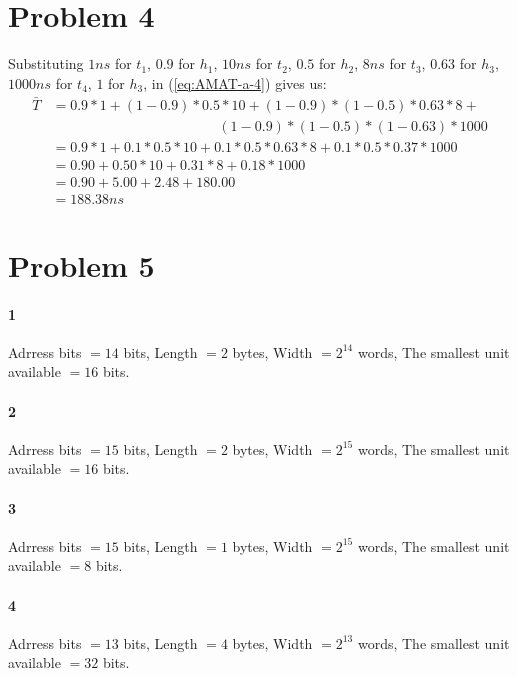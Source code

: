 \documentclass[11pt]{article}
\begin{document}
\section{Problem 4}
Substituting $1ns$ for $t_1$, $0.9$ for $h_1$, $10ns$ for $t_2$, $0.5$ for $h_2$, $8ns$ for $t_3$, $0.63$ for $h_3$,$1000ns$ for $t_4$, $1$ for $h_3$,
in (\ref{eq:AMAT-a-4}) gives us:
\begin{align*}
	\bar{T} &= 0.9 * 1 + (1 - 0.9) * 0.5 * 10 + (1 - 0.9) * (1 - 0.5) * 0.63 * 8 + \\
	&\qquad \phantom{= 0.1 * 1 + (1 - 0.9)} (1 - 0.9) * (1 - 0.5) * (1 - 0.63) * 1000 \\
	&= 0.9 * 1 + 0.1 * 0.5 * 10 + 0.1 * 0.5 * 0.63 * 8 + 0.1 * 0.5 * 0.37 * 1000 \\
	&= 0.90 + 0.50 * 10 + 0.31 * 8 + 0.18 * 1000 \\
	&= 0.90 + 5.00 + 2.48 + 180.00 \\
	&= 188.38ns
\end{align*}
\section{Problem 5}
\paragraph{1}
Adrress bits $= 14$ bits, \qquad Length $= 2$ bytes, \qquad Width $= 2^{14}$ words, \qquad The smallest unit available $= 16$ bits.
\paragraph{2}
Adrress bits $= 15$ bits, \qquad Length $= 2$ bytes, \qquad Width $= 2^{15}$ words, \qquad The smallest unit available $= 16$ bits.
\paragraph{3}
Adrress bits $= 15$ bits, \qquad Length $= 1$ bytes, \qquad Width $= 2^{15}$ words, \qquad The smallest unit available $= 8$ bits.
\paragraph{4}
Adrress bits $= 13$ bits, \qquad Length $= 4$ bytes, \qquad Width $= 2^{13}$ words, \qquad The smallest unit available $= 32$ bits.
\end{document}

